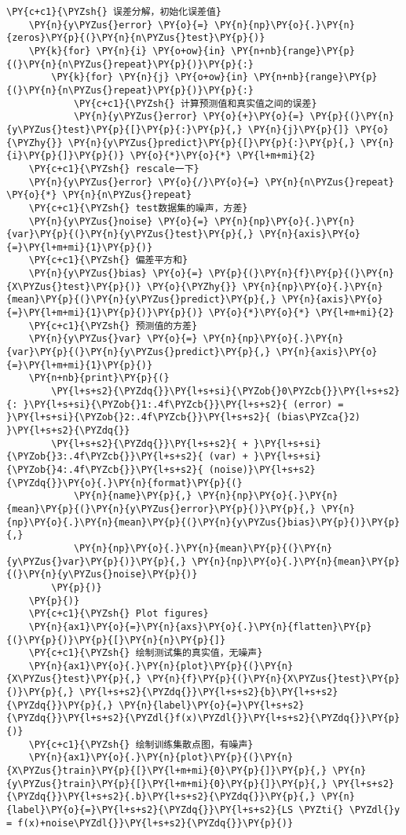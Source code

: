 \begin{Verbatim}[commandchars=\\\{\}]
    \PY{c+c1}{\PYZsh{} 误差分解，初始化误差值}
    \PY{n}{y\PYZus{}error} \PY{o}{=} \PY{n}{np}\PY{o}{.}\PY{n}{zeros}\PY{p}{(}\PY{n}{n\PYZus{}test}\PY{p}{)}
    \PY{k}{for} \PY{n}{i} \PY{o+ow}{in} \PY{n+nb}{range}\PY{p}{(}\PY{n}{n\PYZus{}repeat}\PY{p}{)}\PY{p}{:}
        \PY{k}{for} \PY{n}{j} \PY{o+ow}{in} \PY{n+nb}{range}\PY{p}{(}\PY{n}{n\PYZus{}repeat}\PY{p}{)}\PY{p}{:}
            \PY{c+c1}{\PYZsh{} 计算预测值和真实值之间的误差}
            \PY{n}{y\PYZus{}error} \PY{o}{+}\PY{o}{=} \PY{p}{(}\PY{n}{y\PYZus{}test}\PY{p}{[}\PY{p}{:}\PY{p}{,} \PY{n}{j}\PY{p}{]} \PY{o}{\PYZhy{}} \PY{n}{y\PYZus{}predict}\PY{p}{[}\PY{p}{:}\PY{p}{,} \PY{n}{i}\PY{p}{]}\PY{p}{)} \PY{o}{*}\PY{o}{*} \PY{l+m+mi}{2}
    \PY{c+c1}{\PYZsh{} rescale一下}
    \PY{n}{y\PYZus{}error} \PY{o}{/}\PY{o}{=} \PY{n}{n\PYZus{}repeat} \PY{o}{*} \PY{n}{n\PYZus{}repeat}
    \PY{c+c1}{\PYZsh{} test数据集的噪声，方差}
    \PY{n}{y\PYZus{}noise} \PY{o}{=} \PY{n}{np}\PY{o}{.}\PY{n}{var}\PY{p}{(}\PY{n}{y\PYZus{}test}\PY{p}{,} \PY{n}{axis}\PY{o}{=}\PY{l+m+mi}{1}\PY{p}{)}
    \PY{c+c1}{\PYZsh{} 偏差平方和}
    \PY{n}{y\PYZus{}bias} \PY{o}{=} \PY{p}{(}\PY{n}{f}\PY{p}{(}\PY{n}{X\PYZus{}test}\PY{p}{)} \PY{o}{\PYZhy{}} \PY{n}{np}\PY{o}{.}\PY{n}{mean}\PY{p}{(}\PY{n}{y\PYZus{}predict}\PY{p}{,} \PY{n}{axis}\PY{o}{=}\PY{l+m+mi}{1}\PY{p}{)}\PY{p}{)} \PY{o}{*}\PY{o}{*} \PY{l+m+mi}{2}
    \PY{c+c1}{\PYZsh{} 预测值的方差}
    \PY{n}{y\PYZus{}var} \PY{o}{=} \PY{n}{np}\PY{o}{.}\PY{n}{var}\PY{p}{(}\PY{n}{y\PYZus{}predict}\PY{p}{,} \PY{n}{axis}\PY{o}{=}\PY{l+m+mi}{1}\PY{p}{)}
    \PY{n+nb}{print}\PY{p}{(}
        \PY{l+s+s2}{\PYZdq{}}\PY{l+s+si}{\PYZob{}0\PYZcb{}}\PY{l+s+s2}{: }\PY{l+s+si}{\PYZob{}1:.4f\PYZcb{}}\PY{l+s+s2}{ (error) = }\PY{l+s+si}{\PYZob{}2:.4f\PYZcb{}}\PY{l+s+s2}{ (bias\PYZca{}2) }\PY{l+s+s2}{\PYZdq{}}
        \PY{l+s+s2}{\PYZdq{}}\PY{l+s+s2}{ + }\PY{l+s+si}{\PYZob{}3:.4f\PYZcb{}}\PY{l+s+s2}{ (var) + }\PY{l+s+si}{\PYZob{}4:.4f\PYZcb{}}\PY{l+s+s2}{ (noise)}\PY{l+s+s2}{\PYZdq{}}\PY{o}{.}\PY{n}{format}\PY{p}{(}
            \PY{n}{name}\PY{p}{,} \PY{n}{np}\PY{o}{.}\PY{n}{mean}\PY{p}{(}\PY{n}{y\PYZus{}error}\PY{p}{)}\PY{p}{,} \PY{n}{np}\PY{o}{.}\PY{n}{mean}\PY{p}{(}\PY{n}{y\PYZus{}bias}\PY{p}{)}\PY{p}{,} 
            \PY{n}{np}\PY{o}{.}\PY{n}{mean}\PY{p}{(}\PY{n}{y\PYZus{}var}\PY{p}{)}\PY{p}{,} \PY{n}{np}\PY{o}{.}\PY{n}{mean}\PY{p}{(}\PY{n}{y\PYZus{}noise}\PY{p}{)}
        \PY{p}{)}
    \PY{p}{)}
    \PY{c+c1}{\PYZsh{} Plot figures}
    \PY{n}{ax1}\PY{o}{=}\PY{n}{axs}\PY{o}{.}\PY{n}{flatten}\PY{p}{(}\PY{p}{)}\PY{p}{[}\PY{n}{n}\PY{p}{]}
    \PY{c+c1}{\PYZsh{} 绘制测试集的真实值，无噪声}
    \PY{n}{ax1}\PY{o}{.}\PY{n}{plot}\PY{p}{(}\PY{n}{X\PYZus{}test}\PY{p}{,} \PY{n}{f}\PY{p}{(}\PY{n}{X\PYZus{}test}\PY{p}{)}\PY{p}{,} \PY{l+s+s2}{\PYZdq{}}\PY{l+s+s2}{b}\PY{l+s+s2}{\PYZdq{}}\PY{p}{,} \PY{n}{label}\PY{o}{=}\PY{l+s+s2}{\PYZdq{}}\PY{l+s+s2}{\PYZdl{}f(x)\PYZdl{}}\PY{l+s+s2}{\PYZdq{}}\PY{p}{)}
    \PY{c+c1}{\PYZsh{} 绘制训练集散点图，有噪声}
    \PY{n}{ax1}\PY{o}{.}\PY{n}{plot}\PY{p}{(}\PY{n}{X\PYZus{}train}\PY{p}{[}\PY{l+m+mi}{0}\PY{p}{]}\PY{p}{,} \PY{n}{y\PYZus{}train}\PY{p}{[}\PY{l+m+mi}{0}\PY{p}{]}\PY{p}{,} \PY{l+s+s2}{\PYZdq{}}\PY{l+s+s2}{.b}\PY{l+s+s2}{\PYZdq{}}\PY{p}{,} \PY{n}{label}\PY{o}{=}\PY{l+s+s2}{\PYZdq{}}\PY{l+s+s2}{LS \PYZti{} \PYZdl{}y = f(x)+noise\PYZdl{}}\PY{l+s+s2}{\PYZdq{}}\PY{p}{)}


\end{Verbatim}
